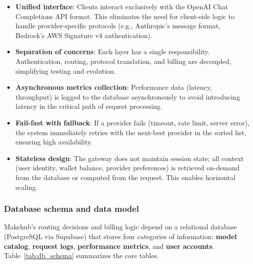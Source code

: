 \documentclass[english]{article}
\begin{document}
\begin{itemize}
    \item \textbf{Unified interface}: Clients interact exclusively with the OpenAI Chat Completions API format. This eliminates the need for client-side logic to handle provider-specific protocols (e.g., Anthropic's message format, Bedrock's AWS Signature v4 authentication).

    \item \textbf{Separation of concerns}: Each layer has a single responsibility. Authentication, routing, protocol translation, and billing are decoupled, simplifying testing and evolution.

    \item \textbf{Asynchronous metrics collection}: Performance data (latency, throughput) is logged to the database asynchronously to avoid introducing latency in the critical path of request processing.

    \item \textbf{Fail-fast with fallback}: If a provider fails (timeout, rate limit, server error), the system immediately retries with the next-best provider in the sorted list, ensuring high availability.

    \item \textbf{Stateless design}: The gateway does not maintain session state; all context (user identity, wallet balance, provider preferences) is retrieved on-demand from the database or computed from the request. This enables horizontal scaling.
\end{itemize}


\subsubsection{Database schema and data model}

Makehub's routing decisions and billing logic depend on a relational database (PostgreSQL via Supabase) that stores four categories of information: \textbf{model catalog}, \textbf{request logs}, \textbf{performance metrics}, and \textbf{user accounts}. Table~\ref{tab:db_schema} summarizes the core tables.
\end{document}
